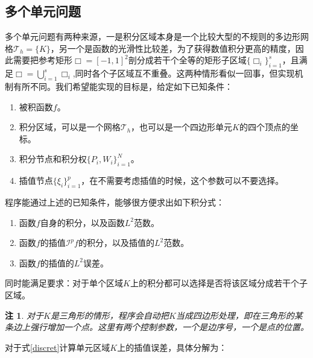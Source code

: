 \documentclass[10pt,reqno, final]{ctexartutf8}
\newtheorem{remark}{注}[section]
\begin{document}
\subsection{多个单元问题}
多个单元问题有两种来源，一是积分区域本身是一个比较大型的不规则的多边形网格$\mathcal{T}_h = \{ K \}$，另一个是函数的光滑性比较差，为了获得数值积分更高的精度，因此需要把参考矩形$\Box = [-1,1]^2$剖分成若干个全等的矩形子区域$\{\Box_i\}_{i=1}^{s}$，且满足$\Box = \bigcup_{i=1}^{s} \Box_i$,同时各个子区域互不重叠。这两种情形看似一回事，但实现机制有所不同。我们希望能实现的目标是，给定如下已知条件：
\begin{enumerate}
  \item 被积函数$f$。
  \item 积分区域，可以是一个网格$\mathcal{T}_h$，也可以是一个四边形单元$K$的四个顶点的坐标。
  \item 积分节点和积分权$\{P_i,W_i\}_{i=1}^{N}$。
  \item 插值节点$\{\xi_i\}_{i=1}^p$，在不需要考虑插值的时候，这个参数可以不要选择。

\end{enumerate}
程序能通过上述的已知条件，能够很方便求出如下积分式：
\begin{enumerate}
  \item 函数$f$自身的积分，以及函数$L^2$范数。
  \item 函数$f$的插值$\mathcal I^p f$的积分，以及插值的$L^2$范数。
  \item 函数$f$的插值的$L^2$误差。
\end{enumerate}
同时能满足要求：对于单个区域$K$上的积分都可以选择是否将该区域分成若干个子区域。
\begin{remark}
  对于$K$是三角形的情形，程序会自动把$K$当成四边形处理，即在三角形的某条边上强行增加一个点。这里有两个控制参数，一个是边序号，一个是点的位置。
\end{remark}
对于式\eqref{discret}计算单元区域$K$上的插值误差，具体分解为：\\
\end{document}
